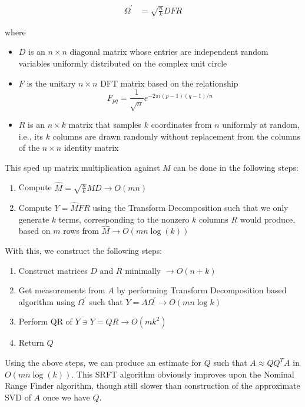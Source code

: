 \documentclass{article}[11pt]
\begin{document}
   \begin{align*}
   \Omega^{'} &= \sqrt{\frac{n}{k}} D F R
   \end{align*}
   
   where 
   
   \begin{itemize}
   \item $D$ is an $n \times n$ diagonal matrix whose entries are independent random variables uniformly distributed on the complex unit circle
   \item $F$ is the unitary $n \times n$ DFT matrix based on the relationship \\ $$F_{pq} = \frac{1}{\sqrt{n}} e^{-2\pi i (p-1) (q-1) / n}$$
   \item $R$ is an $n\times k$ matrix that samples $k$ coordinates from $n$ uniformly at random, i.e., its $k$ columns are drawn randomly without replacement from the columns of the $n\times n$ identity matrix
   \end{itemize}
   
   This sped up matrix multiplication against $M$ can be done in the following steps:
   \begin{enumerate}
   \item Compute $\hat{M} = \sqrt{\frac{n}{k}}MD \rightarrow O(mn)$
   \item Compute $Y = \hat{M} F R$ using the Transform Decomposition such that we only generate $k$ terms, corresponding to the nonzero $k$ columns $R$ would produce, based on $m$ rows from $\hat{M} \rightarrow O(mn\log(k))$
   \end{enumerate}
   
   With this, we construct the following steps:
   
   \begin{enumerate}
   \item Construct matrices $D$ and $R$ minimally $\rightarrow O(n + k)$
   \item Get measurements from $A$ by performing Transform Decomposition based algorithm using $\Omega^{'}$ such that $Y = A\Omega^{'} \rightarrow O(mn \log{k} )$
   \item Perform QR of $Y \ni Y = QR \rightarrow O(mk^2)$
   \item Return $Q$
   \end{enumerate}
   
   Using the above steps, we can produce an estimate for $Q$ such that $A \approx QQ^TA$ in $O(m n \log(k))$. This SRFT algorithm obviously improves upon the Nominal Range Finder algorithm, though still slower than construction of the approximate SVD of $A$ once we have $Q$.
   
\end{document}

